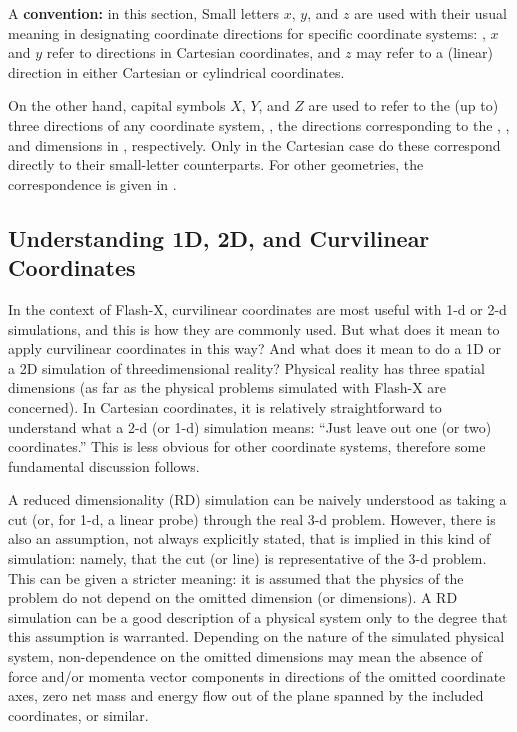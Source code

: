 A \textbf{convention:}
in this section,
Small letters $x$, $y$, and $z$ are used with their usual meaning in
designating coordinate directions for specific coordinate systems:
\ie, $x$ and $y$ refer to directions in Cartesian coordinates,
and $z$ may refer to a (linear) direction in either Cartesian
or cylindrical coordinates.

On the other hand, capital symbols $X$, $Y$, and $Z$ are used to refer to the
(up to) three directions of any coordinate system, \ie,
the directions corresponding to the
, , and 
dimensions in \flashx, respectively.
Only in the Cartesian case do these correspond directly to
their small-letter counterparts. For other geometries,
the correspondence is given in .



\subsection[Understanding 1D, 2D, Curvilinear]{Understanding 1D, 2D, and Curvilinear Coordinates}

In the context of Flash-X, curvilinear coordinates are most useful
with 1-d or 2-d simulations, and this is how they are commonly used.
But what does it mean to apply curvilinear coordinates in this way?
And what does it mean to do a 1D or a 2D simulation of threedimensional reality? 
Physical reality has three spatial
dimensions (as far as the physical problems simulated with Flash-X are concerned).
In Cartesian coordinates, it is relatively straightforward to understand
what a 2-d (or 1-d) simulation means: ``Just leave out one (or two) coordinates.''
This is less obvious for other coordinate systems, therefore
some fundamental discussion follows.

A reduced dimensionality (RD) simulation can be naively understood as
taking a cut (or, for 1-d, a linear probe) through the real 3-d problem.
However, there is also an assumption, not always explicitly stated, that
is implied in this kind of simulation: namely, that
the cut (or line) is representative of the 3-d problem.
This can be given a stricter  meaning:
it is assumed that the physics of the problem do not depend
on the omitted dimension (or dimensions).
A RD simulation can be a good description of a physical
system only to the degree that this assumption is warranted.
Depending on the nature of the simulated physical system,
non-dependence on the omitted dimensions may mean the absence
of force and/or momenta vector components in directions of
the omitted coordinate axes, zero net mass and energy flow
out of the plane spanned by the included coordinates, or similar.

